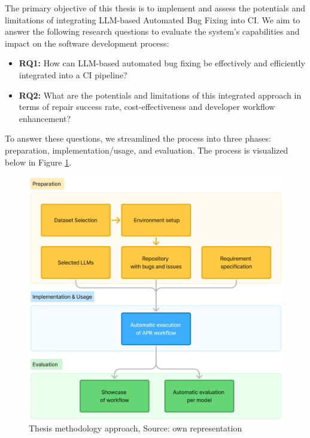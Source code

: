 The primary objective of this thesis is to implement and assess the potentials and limitations of integrating LLM-based Automated Bug Fixing into \acf{CI}. We aim to answer the following research questions to evaluate the system's capabilities and impact on the software development process:

\begin{itemize}
    \item \textbf{RQ1:} How can LLM-based automated bug fixing be effectively and efficiently integrated into a \ac{CI} pipeline?
    \item \textbf{RQ2:} What are the potentials and limitations of this integrated approach in terms of repair success rate, cost-effectiveness and developer workflow enhancement?
\end{itemize}

To answer these questions, we streamlined the process into three phases: preparation, implementation/usage, and evaluation. The process is visualized below in Figure \ref{fig:method-overview}.

\begin{figure}[H]
    \centering
    \includegraphics[width=1\textwidth]{images/flowcharts/method.png}
    \caption{Thesis methodology approach, Source: own representation}
    \label{fig:method-overview}
\end{figure}

